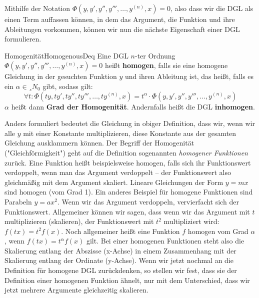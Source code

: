Mithilfe der Notation $\Phi(y,y',y'',y''',\dots,y^{(n)},x) = 0$, also dass wir die DGL als einen Term auffassen können, in dem das Argument, die Funktion und ihre Ableitungen vorkommen, können wir nun die nächste Eigenschaft einer DGL formulieren.

\begin{definition}{Homogenität}{HomogenousDeq}
    Eine DGL $n$-ter Ordnung $\Phi(y,y',y'',y''',\dots,y^{(n)},x) = 0$ heißt \textbf{homogen}, falls sie eine homogene Gleichung in der gesuchten Funktion $y$ und ihren Ableitung ist, das heißt, falls es ein $\alpha\in¸N_0$ gibt, sodass gilt:
    $$
        \forall t: \Phi(ty,ty',ty'',ty''',\dots,ty^{(n)},x) = t^\alpha \cdot \Phi(y,y',y'',y''',\dots,y^{(n)},x)
    $$
    $\alpha$ heißt dann \textbf{Grad der Homogenität}. Andernfalls heißt die DGL \textbf{inhomogen}.
\end{definition}

Anders formuliert bedeutet die Gleichung in obiger Definition, dass wir, wenn wir alle $y$ mit einer Konstante multiplizieren, diese Konstante aus der gesamten Gleichung ausklammern können. Der Begriff der Homogenität ("Gleichförmigkeit") geht auf die Definition sogenannten \emph{homogener Funktionen} zurück. Eine Funktion heißt beispielsweise homogen, falls sich ihr Funktionswert verdoppelt, wenn man das Argument verdoppelt -- der Funktionswert also gleichmäßig mit dem Argument skaliert. Lineare Gleichungen der Form $y=mx$ sind homogen (vom Grad 1). Ein anderes Beispiel für homogene Funktionen sind Parabeln $y=ax^2$. Wenn wir das Argument verdoppeln, vervierfacht sich der Funktionswert. Allgemeiner können wir sagen, dass wenn wir das Argument mit $t$ multiplizieren (skalieren), der Funktionswert mit $t^2$ multipliziert wird: $f(tx)=t^2f(x)$. Noch allgemeiner heißt eine Funktion $f$ homogen vom Grad $\alpha$, wenn $f(tx) = t^\alpha f(x)$ gilt. Bei einer homogenen Funktionen steht also die Skalierung entlang der Abszisse (x-Achse) in einem Zusammenhang mit der Skalierung entlang der Ordinate (y-Achse). Wenn wir jetzt nochmal an die Definition für homogene DGL zurückdenken, so stellen wir fest, dass sie der Definition einer homogenen Funktion ähnelt, nur mit dem Unterschied, dass wir jetzt mehrere Argumente gleichzeitig skalieren.

